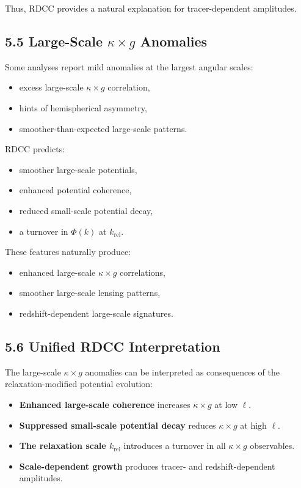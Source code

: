 \documentclass[11pt,a4paper]{article}
\begin{document}
Thus, RDCC provides a natural explanation for tracer-dependent amplitudes.

\subsection*{5.5 Large-Scale \texorpdfstring{$\kappa\times g$}{κ×g} Anomalies}

Some analyses report mild anomalies at the largest angular scales:

\begin{itemize}
    \item excess large-scale $\kappa \times g$ correlation,
    \item hints of hemispherical asymmetry,
    \item smoother-than-expected large-scale patterns.
\end{itemize}

RDCC predicts:

\begin{itemize}
    \item smoother large-scale potentials,
    \item enhanced potential coherence,
    \item reduced small-scale potential decay,
    \item a turnover in $\Phi(k)$ at $k_{\mathrm{rel}}$.
\end{itemize}

These features naturally produce:

\begin{itemize}
    \item enhanced large-scale $\kappa \times g$ correlations,
    \item smoother large-scale lensing patterns,
    \item redshift-dependent large-scale signatures.
\end{itemize}

\subsection*{5.6 Unified RDCC Interpretation}

The large-scale $\kappa \times g$ anomalies can be interpreted as consequences of the 
relaxation-modified potential evolution:

\begin{itemize}
    \item \textbf{Enhanced large-scale coherence} increases $\kappa \times g$ at low $\ell$.
    \item \textbf{Suppressed small-scale potential decay} reduces $\kappa \times g$ at high $\ell$.
    \item \textbf{The relaxation scale $k_{\mathrm{rel}}$} introduces a turnover in all 
          $\kappa \times g$ observables.
    \item \textbf{Scale-dependent growth} produces tracer- and redshift-dependent amplitudes.
\end{itemize}
\end{document}

